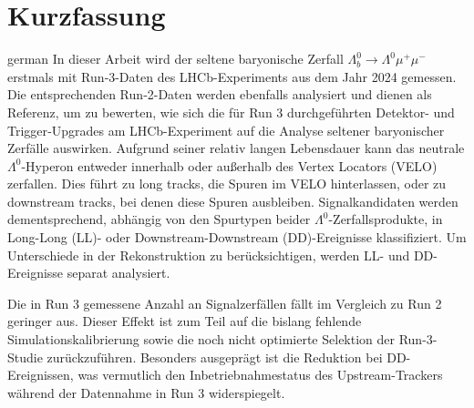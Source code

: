 \section*{Kurzfassung}
\begin{foreignlanguage}{german}
In dieser Arbeit wird der seltene baryonische Zerfall $\Lambda_b^0 \to \Lambda^0 \mu^+ \mu^-$ erstmals mit Run‑3-Daten des LHCb-Experiments aus dem Jahr 2024 gemessen. Die entsprechenden Run‑2-Daten werden ebenfalls analysiert und dienen als Referenz, um zu bewerten, wie sich die für Run 3 durchgeführten Detektor- und Trigger‑Upgrades am LHCb-Experiment auf die Analyse seltener baryonischer Zerfälle auswirken. Aufgrund seiner relativ langen Lebensdauer kann das neutrale $\Lambda^0$-Hyperon entweder innerhalb oder außerhalb des Vertex Locators (VELO) zerfallen. Dies führt zu long tracks, die Spuren im VELO hinterlassen, oder zu downstream tracks, bei denen diese Spuren ausbleiben. Signalkandidaten werden dementsprechend, abhängig von den Spurtypen beider $\Lambda^0$-Zerfallsprodukte, in Long-Long (LL)- oder Downstream-Downstream (DD)-Ereignisse klassifiziert. Um Unterschiede in der Rekonstruktion zu berücksichtigen, werden LL- und DD-Ereignisse separat analysiert.

Die in Run 3 gemessene Anzahl an Signalzerfällen fällt im Vergleich zu Run 2 geringer aus. Dieser Effekt ist zum Teil auf die bislang fehlende Simulationskalibrierung sowie die noch nicht optimierte Selektion der Run-3-Studie zurückzuführen. Besonders ausgeprägt ist die Reduktion bei DD-Ereignissen, was vermutlich den Inbetriebnahmestatus des Upstream-Trackers während der Datennahme in Run 3 widerspiegelt.
\end{foreignlanguage}



